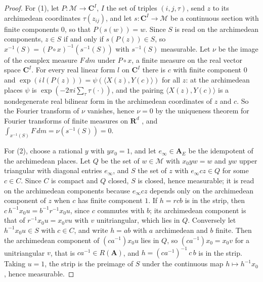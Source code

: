 \begin{proof}
For (1), let $P\colon\mathcal M\to\mathbf C^{I}$, $I$ the set of triples
$(i,j,\tau)$, send $z$ to its archimedean coordinates $\tau(z_{ij})$, and let
$s\colon\mathbf C^I\to\mathcal M$ be a continuous section with finite
components $0$, so that $P(s(w))=w$. Since $S$ is read on the archimedean
components, $z\in S$ if and only if $s(P(z))\in S$, so
$x^{-1}(S)=(P\circ x)^{-1}(s^{-1}(S))$ with $s^{-1}(S)$ measurable. Let $\nu$ be
the image of the complex measure $F\,dm$ under $P\circ x$, a finite measure on
the real vector space $\mathbf C^I$. For every real linear form $l$ on
$\mathbf C^I$ there is $c$ with finite component $0$ and
$\exp(i\,l(P(z)))=\psi(\langle X(z),Y(c)\rangle)$ for all $z$: at the archimedean
places $\psi$ is $\exp(-2\pi i\sum_\tau\tau(\cdot))$, and the pairing
$\langle X(z),Y(c)\rangle$ is a nondegenerate real bilinear form in the
archimedean coordinates of $z$ and $c$. So the Fourier transform of $\nu$
vanishes, hence $\nu=0$ by the uniqueness theorem for Fourier transforms of
finite measures on $\mathbf R^d$ \cite[1.3.6]{Rud62}, and
$\int_{x^{-1}(S)}F\,dm=\nu(s^{-1}(S))=0$.

For (2), choose a rational $y$ with $yx_0=1$, and let $e_\infty\in\mathbf A_E$ be
the idempotent of the archimedean places. Let $Q$ be the set of $w\in\mathcal M$
with $x_0yw=w$ and $yw$ upper triangular with diagonal entries $e_\infty$, and
$S$ the set of $z$ with $e_\infty cz\in Q$ for some $c\in C$. Since $C$ is
compact and $Q$ closed, $S$ is closed, hence measurable; it is read on the
archimedean components because $e_\infty cz$ depends only on the archimedean
component of $z$ when $c$ has finite component $1$. If $h=rcb$ is in the strip,
then $c\,h^{-1}x_0u=b^{-1}r^{-1}x_0u$, since $c$ commutes with $b$; its
archimedean component is that of $r^{-1}x_0u=x_0vu$ with $v$ unitriangular, which
lies in $Q$. Conversely let $h^{-1}x_0u\in S$ with $c\in C$, and write $h=ab$ with
$a$ archimedean and $b$ finite. Then the archimedean component of
$(ca^{-1})x_0u$ lies in $Q$, so $(ca^{-1})x_0=x_0v$ for a unitriangular $v$, that
is $ca^{-1}\in R(\mathbf A)$, and $h=(ca^{-1})^{-1}\,c\,b$ is in the strip.
Taking $u=1$, the strip is the preimage of $S$ under the continuous map
$h\mapsto h^{-1}x_0$, hence measurable.
\end{proof}

